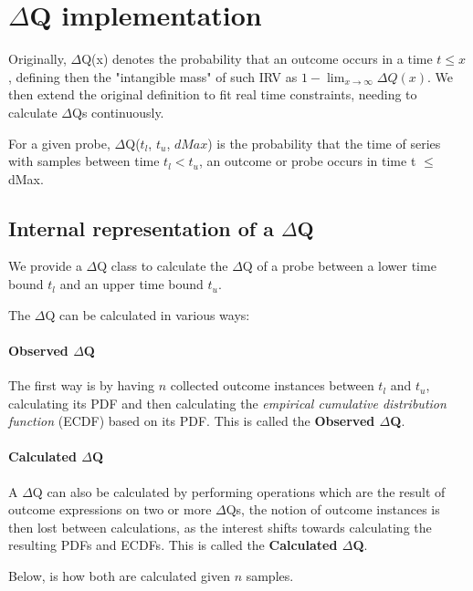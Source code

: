 \section{$\Delta$Q implementation}

Originally, $\Delta$Q(x) denotes the probability that an outcome occurs in a time $t \le x$, defining then the "intangible mass" of such IRV as $1 - \lim_{x\to\infty} \Delta Q (x)$.
We then extend the original definition to fit real time constraints, needing to calculate $\Delta$Qs continuously.

For a given probe, $\Delta$Q($t_l$, $t_u$, $dMax$) is the probability that the time of series with samples between time $t_l < t_u$, an outcome or probe occurs in time t $\le$ dMax.

\subsection{Internal representation of a $\Delta$Q}
    We provide a $\Delta$Q class to calculate the $\Delta$Q of a probe between a lower time bound $t_l$ and an upper time bound $t_u$.
    
    The $\Delta$Q can be calculated in various ways: 
    
    \paragraph{Observed $\Delta$Q}
    
    The first way is by having $n$ collected outcome instances between $t_l$ and $t_u$, calculating its PDF and then calculating the \textit{empirical cumulative distribution function} (ECDF) based on its PDF. This is called the \textbf{Observed $\Delta$Q}.
    
    \paragraph{Calculated $\Delta$Q}
    
    A $\Delta$Q can also be calculated by performing operations which are the result of outcome expressions on two or more $\Delta$Qs, the notion of outcome instances is then lost between calculations, as the interest shifts towards calculating the resulting PDFs and ECDFs. This is called the \textbf{Calculated $\Delta$Q}.
    
    Below, is how both are calculated given $n$ samples.
    
